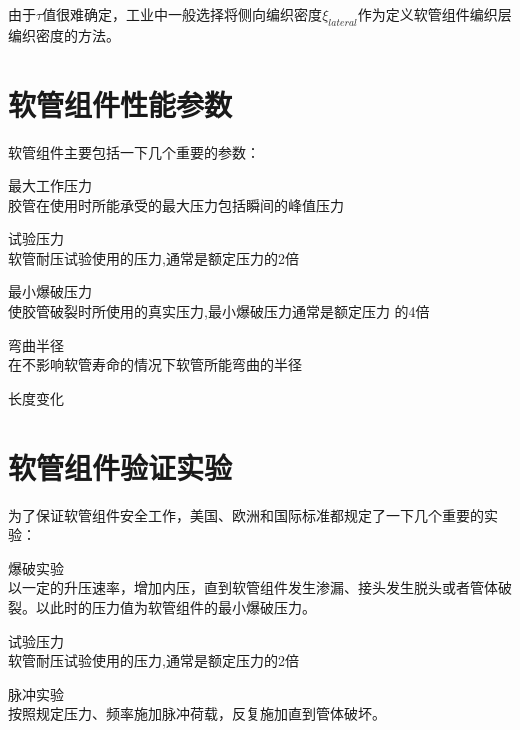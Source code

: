 由于$ \tau $值很难确定，工业中一般选择将侧向编织密度$ \xi_{lateral} $作为定义软管组件编织层编织密度的方法。








\section{软管组件性能参数}

软管组件主要包括一下几个重要的参数：
\begin{compactenum}
	\item 最大工作压力\\
	胶管在使用时所能承受的最大压力包括瞬间的峰值压力
	\item 试验压力\\
	软管耐压试验使用的压力,通常是额定压力的2倍
	\item 最小爆破压力\\
	使胶管破裂时所使用的真实压力,最小爆破压力通常是额定压力 的4倍
	\item 弯曲半径\\
	在不影响软管寿命的情况下软管所能弯曲的半径
	\item 长度变化\\
\end{compactenum}




\section{软管组件验证实验}
为了保证软管组件安全工作，美国、欧洲和国际标准都规定了一下几个重要的实验：
\begin{compactenum}
	\item 爆破实验\\
	以一定的升压速率，增加内压，直到软管组件发生渗漏、接头发生脱头或者管体破裂。以此时的压力值为软管组件的最小爆破压力。
	
	
	\item 试验压力\\
	软管耐压试验使用的压力,通常是额定压力的2倍
	\item 脉冲实验\\
	按照规定压力、频率施加脉冲荷载，反复施加直到管体破坏。
\end{compactenum}	



